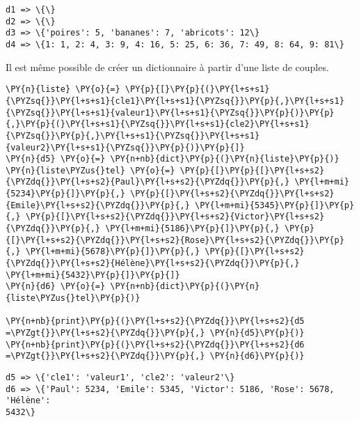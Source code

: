 \documentclass[12pt]{book}
\begin{document}
    \begin{Verbatim}[commandchars=\\\{\}]
d1 => \{\}
d2 => \{\}
d3 => \{'poires': 5, 'bananes': 7, 'abricots': 12\}
d4 => \{1: 1, 2: 4, 3: 9, 4: 16, 5: 25, 6: 36, 7: 49, 8: 64, 9: 81\}
    \end{Verbatim}

    Il est même possible de créer un dictionnaire à partir d'une liste de
couples.

    \begin{tcolorbox}[breakable, size=fbox, boxrule=1pt, pad at break*=1mm,colback=cellbackground, colframe=cellborder]
\begin{Verbatim}[commandchars=\\\{\}]
\PY{n}{liste} \PY{o}{=} \PY{p}{[}\PY{p}{(}\PY{l+s+s1}{\PYZsq{}}\PY{l+s+s1}{cle1}\PY{l+s+s1}{\PYZsq{}}\PY{p}{,}\PY{l+s+s1}{\PYZsq{}}\PY{l+s+s1}{valeur1}\PY{l+s+s1}{\PYZsq{}}\PY{p}{)}\PY{p}{,}\PY{p}{(}\PY{l+s+s1}{\PYZsq{}}\PY{l+s+s1}{cle2}\PY{l+s+s1}{\PYZsq{}}\PY{p}{,}\PY{l+s+s1}{\PYZsq{}}\PY{l+s+s1}{valeur2}\PY{l+s+s1}{\PYZsq{}}\PY{p}{)}\PY{p}{]}
\PY{n}{d5} \PY{o}{=} \PY{n+nb}{dict}\PY{p}{(}\PY{n}{liste}\PY{p}{)}
\PY{n}{liste\PYZus{}tel} \PY{o}{=} \PY{p}{[}\PY{p}{[}\PY{l+s+s2}{\PYZdq{}}\PY{l+s+s2}{Paul}\PY{l+s+s2}{\PYZdq{}}\PY{p}{,} \PY{l+m+mi}{5234}\PY{p}{]}\PY{p}{,} \PY{p}{[}\PY{l+s+s2}{\PYZdq{}}\PY{l+s+s2}{Emile}\PY{l+s+s2}{\PYZdq{}}\PY{p}{,} \PY{l+m+mi}{5345}\PY{p}{]}\PY{p}{,} \PY{p}{[}\PY{l+s+s2}{\PYZdq{}}\PY{l+s+s2}{Victor}\PY{l+s+s2}{\PYZdq{}}\PY{p}{,} \PY{l+m+mi}{5186}\PY{p}{]}\PY{p}{,} \PY{p}{[}\PY{l+s+s2}{\PYZdq{}}\PY{l+s+s2}{Rose}\PY{l+s+s2}{\PYZdq{}}\PY{p}{,} \PY{l+m+mi}{5678}\PY{p}{]}\PY{p}{,} \PY{p}{[}\PY{l+s+s2}{\PYZdq{}}\PY{l+s+s2}{Hélène}\PY{l+s+s2}{\PYZdq{}}\PY{p}{,} \PY{l+m+mi}{5432}\PY{p}{]}\PY{p}{]}
\PY{n}{d6} \PY{o}{=} \PY{n+nb}{dict}\PY{p}{(}\PY{n}{liste\PYZus{}tel}\PY{p}{)}

\PY{n+nb}{print}\PY{p}{(}\PY{l+s+s2}{\PYZdq{}}\PY{l+s+s2}{d5 =\PYZgt{}}\PY{l+s+s2}{\PYZdq{}}\PY{p}{,} \PY{n}{d5}\PY{p}{)}
\PY{n+nb}{print}\PY{p}{(}\PY{l+s+s2}{\PYZdq{}}\PY{l+s+s2}{d6 =\PYZgt{}}\PY{l+s+s2}{\PYZdq{}}\PY{p}{,} \PY{n}{d6}\PY{p}{)}
\end{Verbatim}
\end{tcolorbox}

    \begin{Verbatim}[commandchars=\\\{\}]
d5 => \{'cle1': 'valeur1', 'cle2': 'valeur2'\}
d6 => \{'Paul': 5234, 'Emile': 5345, 'Victor': 5186, 'Rose': 5678, 'Hélène':
5432\}
    \end{Verbatim}
\end{document}
